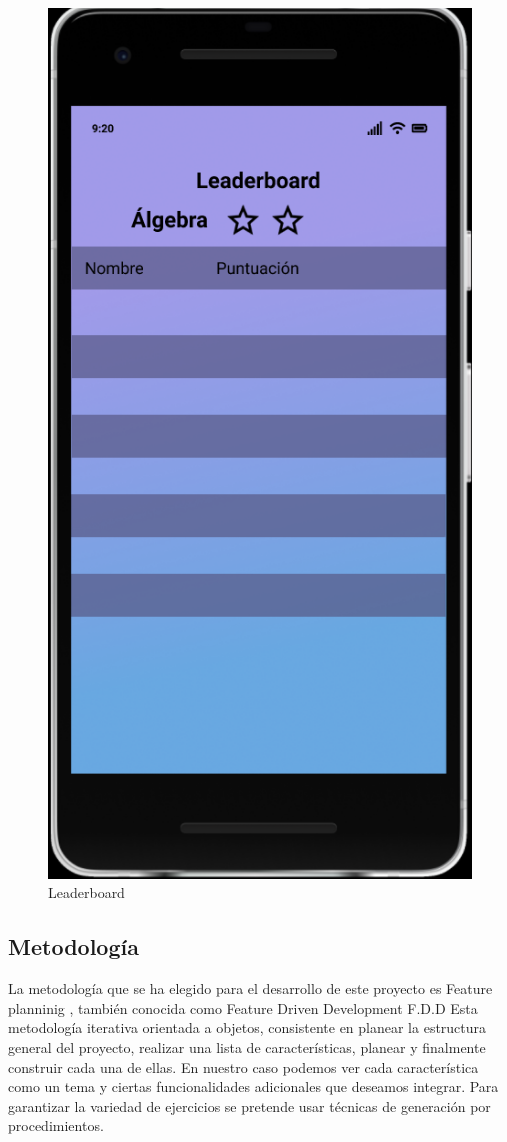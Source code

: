 \documentclass{article}
\begin{document}
\begin{figure}[H]
    \centering
    \includegraphics[scale=0.9]{imgs/Figma/Leaderboard}
    \caption{Leaderboard}
\end{figure}

\subsection{Metodología}
La metodología que se ha elegido para el desarrollo de este proyecto es Feature planninig 
\cite{hunt2006feature}, también conocida como Feature Driven 
Development F.D.D Esta metodología iterativa orientada a objetos, consistente en planear 
la estructura general del proyecto, realizar una lista de características, planear y finalmente 
construir cada una de ellas. En nuestro caso podemos ver cada característica como un tema y ciertas 
funcionalidades adicionales que deseamos integrar. Para garantizar la variedad de ejercicios se 
pretende usar técnicas de generación por procedimientos.
\end{document}
